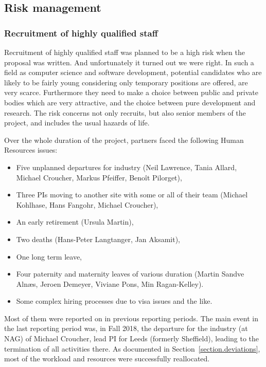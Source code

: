 \subsection{Risk management}
\label{section.risk_management}
\subsubsection{Recruitment of highly qualified staff}

Recruitment of highly qualified staff was planned to be a high risk
when the proposal was written. And unfortunately it turned out we were
right. In such a field as computer science and software development,
potential candidates who are likely to be fairly young considering
only temporary positions are offered, are very scarce. Furthermore
they need to make a choice between public and private bodies which are
very attractive, and the choice between pure development and research.
The risk concerns not only recruits, but also senior members of the
project, and includes the usual hazards of life.

Over the whole duration of the project, \ODK partners faced the
following Human Resources issues:
\begin{itemize}
\item Five unplanned departures for industry (Neil Lawrence, Tania
  Allard, Michael Croucher, Markus Pfeiffer, Benoît Pilorget),
\item Three PIs moving to another site with some or all of their team
  (Michael Kohlhase, Hans Fangohr, Michael Croucher),
\item An early retirement (Ursula Martin),
\item Two deaths (Hans-Peter Langtanger, Jan Aksamit),
\item One long term leave,
\item Four paternity and maternity leaves of various duration (Martin
  Sandve Alnæs, Jeroen Demeyer, Viviane Pons, Min Ragan-Kelley).
\item Some complex hiring processes due to visa issues and the like.
\end{itemize}

Most of them were reported on in previous reporting periods. The main
event in the last reporting period was, in Fall 2018, the departure
for the industry (at NAG) of Michael Croucher, lead PI for Leeds
(formerly Sheffield), leading to the termination of all activities
there. As documented in Section~\ref{section.deviations}, most of the
workload and resources were successfully reallocated.

